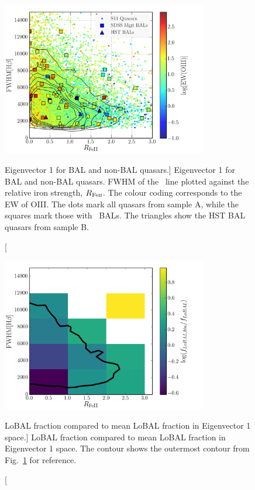 \begin{figure}
\centering
\includegraphics[width=0.8\textwidth]{figures/ewpaper/ev1.png}
\caption
[Eigenvector 1 for BAL and non-BAL quasars.]
{
Eigenvector 1 for BAL and non-BAL quasars. 
FWHM of the \hb\ line plotted against the relative
iron strength, $R_{{\rm Fe \textsc{ii}}}$. The colour coding
corresponds to the EW of OIII. The dots mark all quasars from
sample A, while the squares mark those with \mgii\ BALs.
The triangles show the HST BAL quasars from sample B.
}
\label{fig:bal_ev1}
\end{figure}

\begin{figure}
\centering
\includegraphics[width=0.8\textwidth]{figures/ewpaper/ev1_bins.png}
\caption
[LoBAL fraction compared to mean LoBAL fraction in Eigenvector 1 space.]
{
LoBAL fraction compared to mean LoBAL fraction in Eigenvector 1 space.
The contour shows the outermost contour from Fig.~\ref{fig:bal_ev1} for
reference.
}
\label{fig:bal_ev1_bins}
\end{figure}

